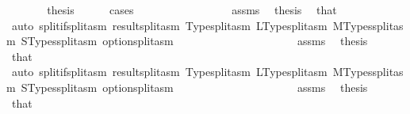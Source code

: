 \begin{isabellebody}
\ \ \ \ \isamarkupfalse%
\ \isamarkupfalse%
\ {\isacharquery}{\kern0pt}thesis\isanewline
\ \ \ \ \isamarkupfalse%
\ cases\isanewline
\ \ \ \ \ \ \isamarkupfalse%
\ {}{}\isanewline
\ \ \ \ \ \ \isamarkupfalse%
\ {}\ assms\ \isamarkupfalse%
\ {\isacharquery}{\kern0pt}thesis\ \isamarkupfalse%
\ that{\isacharparenleft}{\kern0pt}{}{\isacharparenright}{\kern0pt}\ \isamarkupfalse%
\ {\isacharparenleft}{\kern0pt}auto\ split{\isacharcolon}{\kern0pt}if{\isacharunderscore}{\kern0pt}split{\isacharunderscore}{\kern0pt}asm\ result{\isachardot}{\kern0pt}split{\isacharunderscore}{\kern0pt}asm\ Type{\isachardot}{\kern0pt}split{\isacharunderscore}{\kern0pt}asm\ LType{\isachardot}{\kern0pt}split{\isacharunderscore}{\kern0pt}asm\ MTypes{\isachardot}{\kern0pt}split{\isacharunderscore}{\kern0pt}asm\ STypes{\isachardot}{\kern0pt}split{\isacharunderscore}{\kern0pt}asm\ option{\isachardot}{\kern0pt}split{\isacharunderscore}{\kern0pt}asm{\isacharparenright}{\kern0pt}\isanewline
\ \ \ \ \isamarkupfalse%
\isanewline
\ \ \ \ \ \ \isamarkupfalse%
\ {}{}\isanewline
\ \ \ \ \ \ \isamarkupfalse%
\ {}\ assms\ \isamarkupfalse%
\ {\isacharquery}{\kern0pt}thesis\ \isamarkupfalse%
\ that{\isacharparenleft}{\kern0pt}{}{\isacharparenright}{\kern0pt}\ \isamarkupfalse%
\ {\isacharparenleft}{\kern0pt}auto\ split{\isacharcolon}{\kern0pt}if{\isacharunderscore}{\kern0pt}split{\isacharunderscore}{\kern0pt}asm\ result{\isachardot}{\kern0pt}split{\isacharunderscore}{\kern0pt}asm\ Type{\isachardot}{\kern0pt}split{\isacharunderscore}{\kern0pt}asm\ LType{\isachardot}{\kern0pt}split{\isacharunderscore}{\kern0pt}asm\ MTypes{\isachardot}{\kern0pt}split{\isacharunderscore}{\kern0pt}asm\ STypes{\isachardot}{\kern0pt}split{\isacharunderscore}{\kern0pt}asm\ option{\isachardot}{\kern0pt}split{\isacharunderscore}{\kern0pt}asm{\isacharparenright}{\kern0pt}\isanewline
\ \ \ \ \isamarkupfalse%
\isanewline
\ \ \ \ \ \ \isamarkupfalse%
\ {}{}\isanewline
\ \ \ \ \ \ \isamarkupfalse%
\ {}\ assms\ \isamarkupfalse%
\ {\isacharquery}{\kern0pt}thesis\ \isamarkupfalse%
\ that{\isacharparenleft}{\kern0pt}{}{\isacharparenright}{\kern0pt}\ \isamarkupfalse%

\end{isabellebody}
